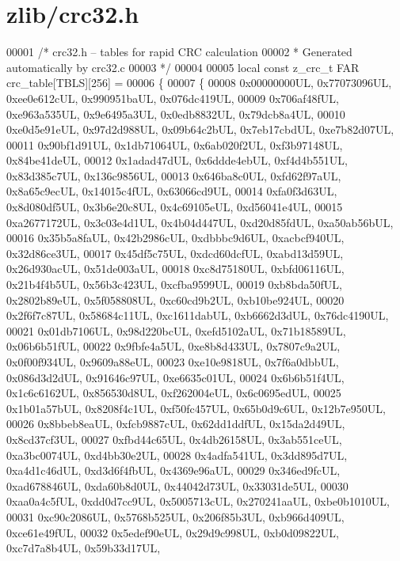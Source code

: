 \hypertarget{zlib_2crc32_8h_source}{}\section{zlib/crc32.h}
\label{zlib_2crc32_8h_source}

\begin{DoxyCode}
00001 \textcolor{comment}{/* crc32.h -- tables for rapid CRC calculation}
00002 \textcolor{comment}{ * Generated automatically by crc32.c}
00003 \textcolor{comment}{ */}
00004 
00005 local \textcolor{keyword}{const} z\_crc\_t FAR crc\_table[TBLS][256] =
00006 \{
00007   \{
00008     0x00000000UL, 0x77073096UL, 0xee0e612cUL, 0x990951baUL, 0x076dc419UL,
00009     0x706af48fUL, 0xe963a535UL, 0x9e6495a3UL, 0x0edb8832UL, 0x79dcb8a4UL,
00010     0xe0d5e91eUL, 0x97d2d988UL, 0x09b64c2bUL, 0x7eb17cbdUL, 0xe7b82d07UL,
00011     0x90bf1d91UL, 0x1db71064UL, 0x6ab020f2UL, 0xf3b97148UL, 0x84be41deUL,
00012     0x1adad47dUL, 0x6ddde4ebUL, 0xf4d4b551UL, 0x83d385c7UL, 0x136c9856UL,
00013     0x646ba8c0UL, 0xfd62f97aUL, 0x8a65c9ecUL, 0x14015c4fUL, 0x63066cd9UL,
00014     0xfa0f3d63UL, 0x8d080df5UL, 0x3b6e20c8UL, 0x4c69105eUL, 0xd56041e4UL,
00015     0xa2677172UL, 0x3c03e4d1UL, 0x4b04d447UL, 0xd20d85fdUL, 0xa50ab56bUL,
00016     0x35b5a8faUL, 0x42b2986cUL, 0xdbbbc9d6UL, 0xacbcf940UL, 0x32d86ce3UL,
00017     0x45df5c75UL, 0xdcd60dcfUL, 0xabd13d59UL, 0x26d930acUL, 0x51de003aUL,
00018     0xc8d75180UL, 0xbfd06116UL, 0x21b4f4b5UL, 0x56b3c423UL, 0xcfba9599UL,
00019     0xb8bda50fUL, 0x2802b89eUL, 0x5f058808UL, 0xc60cd9b2UL, 0xb10be924UL,
00020     0x2f6f7c87UL, 0x58684c11UL, 0xc1611dabUL, 0xb6662d3dUL, 0x76dc4190UL,
00021     0x01db7106UL, 0x98d220bcUL, 0xefd5102aUL, 0x71b18589UL, 0x06b6b51fUL,
00022     0x9fbfe4a5UL, 0xe8b8d433UL, 0x7807c9a2UL, 0x0f00f934UL, 0x9609a88eUL,
00023     0xe10e9818UL, 0x7f6a0dbbUL, 0x086d3d2dUL, 0x91646c97UL, 0xe6635c01UL,
00024     0x6b6b51f4UL, 0x1c6c6162UL, 0x856530d8UL, 0xf262004eUL, 0x6c0695edUL,
00025     0x1b01a57bUL, 0x8208f4c1UL, 0xf50fc457UL, 0x65b0d9c6UL, 0x12b7e950UL,
00026     0x8bbeb8eaUL, 0xfcb9887cUL, 0x62dd1ddfUL, 0x15da2d49UL, 0x8cd37cf3UL,
00027     0xfbd44c65UL, 0x4db26158UL, 0x3ab551ceUL, 0xa3bc0074UL, 0xd4bb30e2UL,
00028     0x4adfa541UL, 0x3dd895d7UL, 0xa4d1c46dUL, 0xd3d6f4fbUL, 0x4369e96aUL,
00029     0x346ed9fcUL, 0xad678846UL, 0xda60b8d0UL, 0x44042d73UL, 0x33031de5UL,
00030     0xaa0a4c5fUL, 0xdd0d7cc9UL, 0x5005713cUL, 0x270241aaUL, 0xbe0b1010UL,
00031     0xc90c2086UL, 0x5768b525UL, 0x206f85b3UL, 0xb966d409UL, 0xce61e49fUL,
00032     0x5edef90eUL, 0x29d9c998UL, 0xb0d09822UL, 0xc7d7a8b4UL, 0x59b33d17UL,

\end{DoxyCode}
